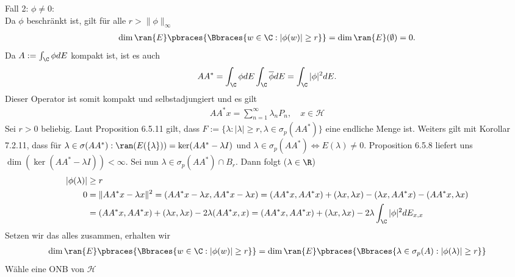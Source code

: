 \begin{solution}
Fall 2: $\phi \neq 0:$ \\
Da $\phi$ beschränkt ist, gilt für alle $r > \|\phi\|_{\infty}$
\begin{align*}
  \dim{\ran{E}}\pbraces{\Bbraces{w \in \C:|\phi(w)| \geq r}}
  = \dim{\ran{E}}(\emptyset) = 0.
\end{align*}
Da $A := \int_{\C} \phi dE$ kompakt ist, ist es auch
\begin{align*}
  AA^* = \int_{\C} \phi dE\int_{\C} \overline{\phi} dE = \int_{\C} |\phi|^2 dE.
\end{align*}
Dieser Operator ist somit kompakt und selbstadjungiert und es gilt
\begin{align*}
  AA^*x = \sum_{n=1}^{\infty}\lambda_nP_n, \quad x \in \mathcal{H}
\end{align*}
Sei $r > 0$ beliebig. Laut Proposition 6.5.11 gilt, dass
$F := \{\lambda: |\lambda| \geq r, \lambda \in \sigma_p(AA^*)\}$ eine endliche Menge
ist.
Weiters gilt mit Korollar 7.2.11, dass für
$\lambda \in \sigma(AA^*) : \ran(E(\{\lambda\})) = \ker(AA^* - \lambda I)$
und $\lambda \in \sigma_p(AA^*) \iff E(\lambda) \neq 0$.
Proposition 6.5.8 liefert uns $\dim(\ker(AA^* -\lambda I)) < \infty$.
Sei nun $\lambda \in \sigma_p(AA^*) \cap B_r$. Dann folgt ($\lambda \in \R$)
\begin{align*}
  |\phi(\lambda)| &\geq r \\
  0 &= \|AA^*x - \lambda x\|^2 = (AA^*x - \lambda x,AA^*x - \lambda x)
  = (AA^*x,AA^*x) + (\lambda x, \lambda x) -(\lambda x,AA^*x) - (AA^*x,\lambda x) \\
  &= (AA^*x,AA^*x) + (\lambda x, \lambda x) -2\lambda(AA^*x,x)
  = (AA^*x,AA^*x) + (\lambda x, \lambda x) -2\lambda\int_{\C}|\phi|^2dE_{x,x}
\end{align*}
Setzen wir das alles zusammen, erhalten wir
\begin{align*}
  \dim{\ran{E}}\pbraces{\Bbraces{w \in \C:|\phi(w)| \geq r}} =
  \dim{\ran{E}}\pbraces{\Bbraces{\lambda \in \sigma_p(A):|\phi(\lambda)| \geq r}}
\end{align*}
Wähle eine ONB von $\mathcal{H}$
\end{solution}
